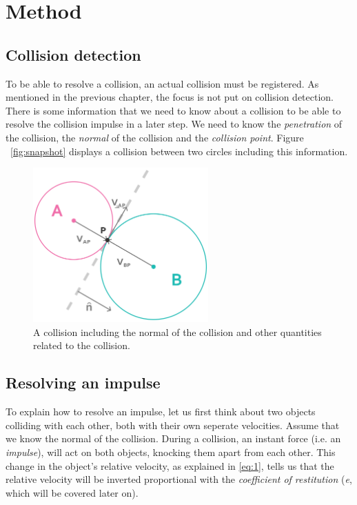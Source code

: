 \documentclass[a4paper,12pt]{report}
\begin{document}
\chapter{Method}

\section{Collision detection}

To be able to resolve a collision, an actual collision must be registered. As mentioned in the previous chapter, the focus is not put on collision detection. There is some information that we need to know about a collision to be able to resolve the collision impulse in a later step. We need to know the \emph{penetration} of the collision, the \emph{normal} of the collision and the \emph{collision point}. Figure ~\ref{fig:snapshot} displays a collision between two circles including this information.

\begin{figure}[!ht]
    \centering
    \includegraphics[width=0.6\textwidth]{figures/collision.png}
    \caption{A collision including the normal of the collision and other quantities related to the collision.}
    \label{fig:collision}
\end{figure}

\section{Resolving an impulse}

To explain how to resolve an impulse\cite{gdm}, let us first think about two objects colliding with each other, both with their own seperate velocities. Assume that we know the normal of the collision. During a collision, an instant force (i.e. an \emph{impulse}), will act on both objects, knocking them apart from each other. This change in the object's relative velocity, as explained in \ref{eq:1}, tells us that the relative velocity will be inverted proportional with the \emph{coefficient of restitution} (\emph{e}, which will be covered later on).
\end{document}
